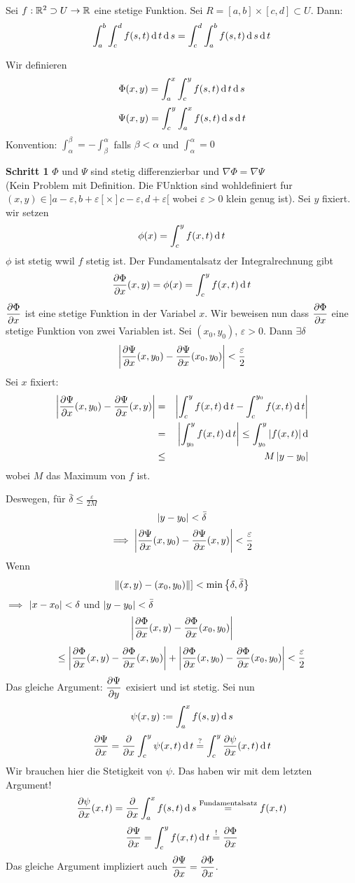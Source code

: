 \begin{Sat}
  Sei $f:{\mathbb{R}^2} \supset U\rightarrow\mathbb{R}$ eine stetige Funktion. Sei $R=[a,b]\times [c,d]\subset U$. Dann:
  \[\int_a^b\int_c^d f(s,t)\operatorname{d} t\operatorname{d} s=\int_c^d\int_a^b f(s,t)\operatorname{d} s\operatorname{d} t\]
\end{Sat}
\begin{Bew}
  Wir definieren
  \[\Phi(x,y)=\int_a^x\int_c^yf(s,t)\operatorname{d} t\operatorname{d} s\]
  \[\Psi(x,y)=\int_c^y\int_a^x f(s,t)\operatorname{d} s\operatorname{d} t\]
  Konvention: $\int_\alpha^\beta = -\int_\beta^\alpha$ falls $\beta<\alpha$ und $\int_\alpha^\alpha=0$ 

\medskip

{\bf Schritt 1}    $\Phi$ und $\Psi$ sind stetig differenzierbar und $\nabla \Phi = \nabla\Psi$ \\
 (Kein Problem mit Definition. Die FUnktion sind wohldefiniert fur $(x,y)\in ]a-\varepsilon,b+\varepsilon[\times ]c-\varepsilon,d+\varepsilon [$ wobei $\varepsilon>0$ klein genug ist).
  Sei $y$ fixiert. wir setzen
  \[\phi(x)=\int_c^yf(x,t)\operatorname{d} t\]
  $\phi$ ist stetig wwil $f$ stetig ist. Der Fundamentalsatz der Integralrechnung gibt
  \[\dfrac{\partial \Phi}{\partial x}(x,y)=\phi(x)=\int_c^y f(x,t)\operatorname{d} t\]
    $\dfrac{\partial \Phi}{\partial x}$ ist eine stetige Funktion in der Variabel $x$. Wir beweisen nun dass $\dfrac{\partial \Phi}{\partial x}$ 
eine stetige Funktion von zwei Variablen ist.
    Sei $(x_0,y_0)$, $\varepsilon>0$. Dann $\exists \delta$
    \[\left| \dfrac{\partial \Psi}{\partial x}(x,y_0)-\dfrac{\partial \Psi}{\partial x}(x_0,y_0) \right|<\frac{\varepsilon}{2}\]
  Sei $x$ fixiert:
  \begin{eqnarray*}
\left| \dfrac{\partial \Psi}{\partial x}(x,y_0)-\dfrac{\partial \Psi}{\partial x}(x,y) \right|
  &=&\left| \int_c^yf(x,t)\operatorname{d} t-\int_c^{y_0}f(x,t)\operatorname{d} t \right|\\
  &=&\left| \int_{y_0}^yf(x,t)\operatorname{d} t \right|\leq \int_{y_0}^y\left| f(x,t) \right|\operatorname{d}\\
  &\leq& M\left| y-y_0 \right|
\end{eqnarray*}
 wobei $M$ das Maximum von $f$ ist.

 Deswegen,
  für $\bar\delta \leq \frac{\varepsilon}{2M}$
  \[\left| y-y_0 \right|<\bar\delta\]
  \[\implies \left| \dfrac{\partial \Psi}{\partial x}(x,y_0)-\dfrac{\partial \Psi}{\partial x}(x,y) \right|<\frac{\varepsilon}{2}\]
  Wenn
  \[\left\| (x,y)-(x_0,y_0) \right\|]<\min \left\{ \delta,\bar\delta \right\} \]
  $\implies$ $\left| x-x_0 \right|<\delta$ und $\left| y-y_0 \right|<\bar\delta$
  \[\left| \dfrac{\partial \Phi}{\partial x}(x,y)-\dfrac{\partial \Phi}{\partial x}(x_0,y_0) \right|\]
  \[\leq \left| \dfrac{\partial \Phi}{\partial x}(x,y)-\dfrac{\partial \Phi}{\partial x}(x,y_0) \right|+\left| \dfrac{\partial \Phi}{\partial x}(x,y_0)-\dfrac{\partial \Phi}{\partial x}(x_0,y_0) \right|<\frac{\varepsilon}{2}\]
  Das gleiche Argument: $\dfrac{\partial \Psi}{\partial y}$ exisiert und ist stetig.
Sei nun
  \[\psi(x,y):=\int_a^xf(s,y)\operatorname{d} s\]
  \[\dfrac{\partial \Psi}{\partial x}=\dfrac{\partial }{\partial x}\int_c^y\psi(x,t)\operatorname{d} t
  \stackrel{?}{=}\int_c^y\dfrac{\partial \psi}{\partial x}(x,t)\operatorname{d} t\]
  Wir brauchen hier die Stetigkeit von $\psi$. Das haben wir mit dem letzten Argument!
  \begin{equation}
    \label{e:1104062}
    \dfrac{\partial \psi}{\partial x}(x,t)=\dfrac{\partial }{\partial x}\int_a^xf(s,t)\operatorname{d} s\stackrel{\text{Fundamentalsatz}}{=}f(x,t)
  \end{equation}
  \[\dfrac{\partial \Psi}{\partial x}=\int_c^yf(x,t)\operatorname{d} t\stackrel{!}{=}\dfrac{\partial \Phi}{\partial x}\]
  Das gleiche Argument impliziert auch $\dfrac{\partial \Psi}{\partial x}=\dfrac{\partial \Phi}{\partial x}$. 


\end{Bew}
